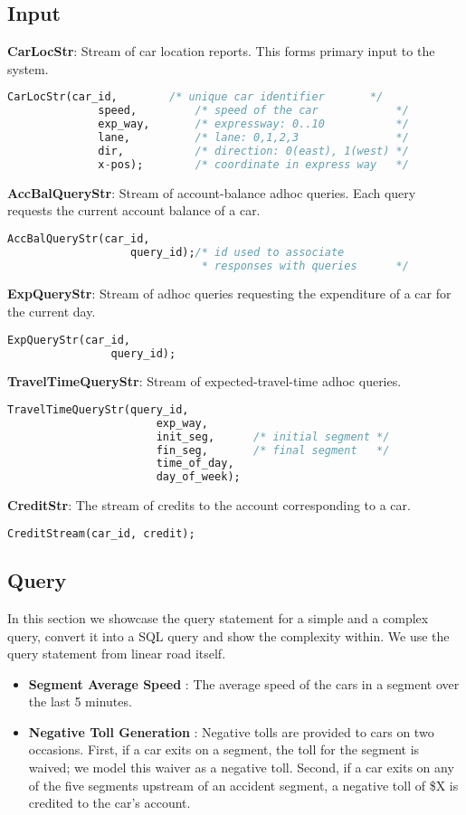 \subsection{Input}
\textbf{CarLocStr}: Stream of car location reports. This forms primary input to the system. 
\begin{lstlisting}[language=SQL]
    CarLocStr(car_id,        /* unique car identifier       */
              speed,         /* speed of the car            */
              exp_way,       /* expressway: 0..10           */
              lane,          /* lane: 0,1,2,3               */ 
              dir,           /* direction: 0(east), 1(west) */
              x-pos);        /* coordinate in express way   */
\end{lstlisting}
\textbf{AccBalQueryStr}: Stream of account-balance adhoc queries. Each query requests the current account balance of a car. 
\begin{lstlisting}[language=SQL]
    AccBalQueryStr(car_id,   
                   query_id);/* id used to associate 
                              * responses with queries      */
\end{lstlisting}
\textbf{ExpQueryStr}: Stream of adhoc queries requesting the expenditure of a car for the current day. 
\begin{lstlisting}[language=SQL]
    ExpQueryStr(car_id,
                query_id);
\end{lstlisting}
\textbf{TravelTimeQueryStr}: Stream of expected-travel-time adhoc queries. 
\begin{lstlisting}[language=SQL]
    TravelTimeQueryStr(query_id,
                       exp_way,
                       init_seg,      /* initial segment */
                       fin_seg,       /* final segment   */
                       time_of_day,   
                       day_of_week);
\end{lstlisting}
\textbf{CreditStr}: The stream of credits to the account corresponding to a car. 
\begin{lstlisting}[language=SQL]                   
    CreditStream(car_id, credit);
\end{lstlisting}

\subsection{Query}
In this section we showcase the query statement for a simple and a complex query, convert it into a SQL query and show the complexity within. We use the query statement from linear road itself.
\begin{itemize}
    \item \textbf{Segment Average Speed } : The average speed of the cars in a segment over the last 5 minutes. 
    \item \textbf{Negative Toll Generation} : Negative tolls are provided to cars on two occasions. First, if a car exits on a segment, the toll for the segment is waived; we model this waiver as a negative toll. Second, if a car exits on any of the five segments upstream of an accident segment, a negative toll of \$X is credited to the car's account. 
\end{itemize}

